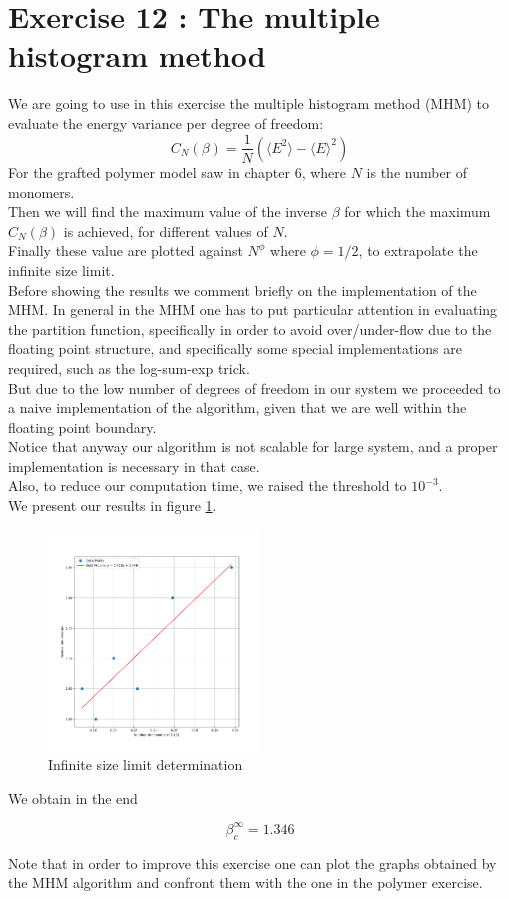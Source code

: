 \chapter*{Exercise 12 : The multiple histogram method}
We are going to use in this exercise the multiple histogram method (MHM) to evaluate the energy variance per degree of freedom:
$$C_N(\beta) = \frac{1}{N} (\langle E^2 \rangle -\langle E \rangle^2) $$ 
For the grafted polymer model saw in chapter 6, where $N$ is the number of monomers. \\
Then we will find the maximum value of the inverse $\beta$ for which the maximum $C_N(\beta)$ is achieved, for different values of $N$. \\
Finally these value are plotted against $N^\phi$ where $\phi = 1/2$, to extrapolate the infinite size limit. \\

Before showing the results we comment briefly on the implementation of the MHM. 
In general in the MHM one has to put particular attention in evaluating the partition function, specifically in order to avoid over/under-flow due to the 
floating point structure, and specifically some special implementations are required, such as the log-sum-exp trick. \\
But due to the low number of degrees of freedom in our system we proceeded to a naive implementation of the algorithm, given that we are well within the floating point boundary. \\
Notice that anyway our algorithm is not scalable for large system, and a proper implementation is necessary in that case. \\
Also, to reduce our computation time, we raised the threshold to $10^{-3}$. \\
We present our results in figure \ref{ex12:infinite_size}.

\begin{figure}[htp]
    \centering
    \includegraphics[width=0.5\textwidth]{FIG/ex12/infinite_size.png}
    \caption{Infinite size limit determination}
    \label{ex12:infinite_size}
\end{figure}

We obtain in the end 

$$\beta_c^{\infty} = 1.346$$

Note that in order to improve this exercise one can plot the graphs obtained by the MHM algorithm and confront them with the one in the polymer exercise. 